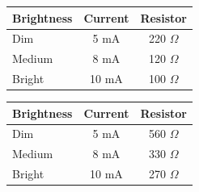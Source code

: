 


\begin{tabular}{|l|c|c|}
\hline
Brightness & Current & Resistor \\
\hline
Dim        & 5 mA  & 220 $\Omega$ \\
Medium     & 8 mA  & 120 $\Omega$ \\
Bright     & 10 mA & 100 $\Omega$ \\
\hline
\end{tabular}


\begin{tabular}{|l|c|c|}
\hline
Brightness & Current & Resistor \\
\hline
Dim        & 5 mA  & 560 $\Omega$ \\
Medium     & 8 mA  & 330 $\Omega$ \\
Bright     & 10 mA & 270 $\Omega$ \\
\hline
\end{tabular}
